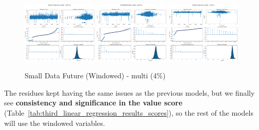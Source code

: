 \documentclass[11pt,english,a4paper,hidelinks]{book}
\begin{document}
\begin{figure}[H]
    \centering
    \includegraphics[width=0.32\textwidth]{images/code/models/linear_regression/third_model/Multi/quality_profit_1m_residuals.png}
    \includegraphics[width=0.32\textwidth]{images/code/models/linear_regression/third_model/Multi/quality_profit_1y_residuals.png}
    \includegraphics[width=0.32\textwidth]{images/code/models/linear_regression/third_model/Multi/quality_profit_5y_residuals.png}
    \caption{Small Data Future (Windowed) - \acrshort{multi} (4\%)}
    \label{fig:third_linear_regression_residuals}
\end{figure}

\noindent The residues kept having the same issues as the previous models, but we finally see \textbf{consistency and significance in the value score} (Table~\ref{tab:third_linear_regression_results_scores}), so the rest of the models will use the windowed variables.
\end{document}
